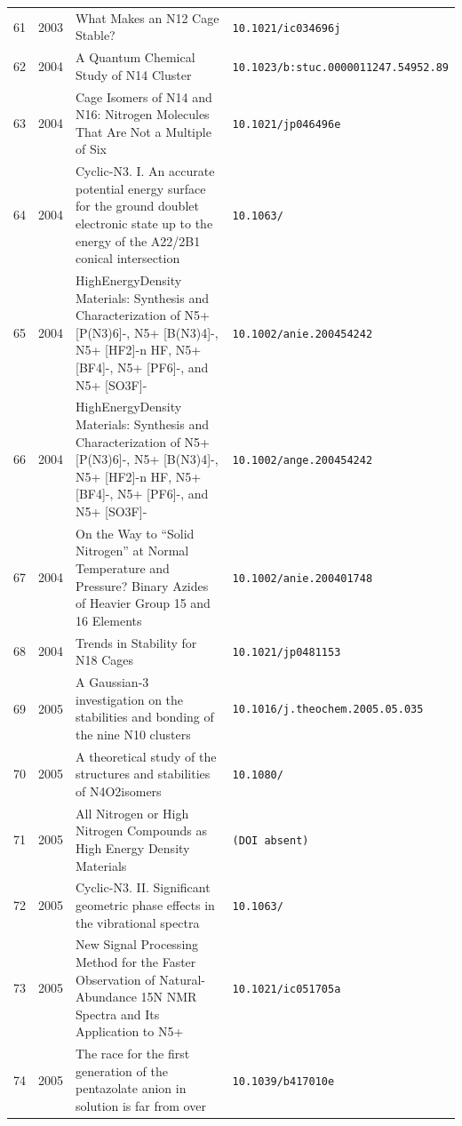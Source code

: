 {\begin{longtable}{@{}cp{1.0cm}p{8.4cm}p{4.2cm}@{}}
61 & 2003 & What Makes an N12 Cage Stable? & \texttt{10.1021/\allowbreak ic034696j} \\
62 & 2004 & A Quantum Chemical Study of N14 Cluster & \texttt{10.1023/\allowbreak b:stuc.0000011247.54952.89} \\
63 & 2004 & Cage Isomers of N14 and N16: Nitrogen Molecules That Are Not a Multiple of Six & \texttt{10.1021/\allowbreak jp046496e} \\
64 & 2004 & Cyclic-N3. I. An accurate potential energy surface for the ground doublet electronic state up to the energy of the A22/2B1 conical intersection & \texttt{10.1063/\allowbreak 1.1780158} \\
65 & 2004 & HighEnergyDensity Materials: Synthesis and Characterization of N5+[P(N3)6]-, N5+ [B(N3)4]-, N5+ [HF2]-n HF, N5+ [BF4]-, N5+ [PF6]-, and N5+ [SO3F]- & \texttt{10.1002/\allowbreak anie.200454242} \\
66 & 2004 & HighEnergyDensity Materials: Synthesis and Characterization of N5+[P(N3)6]-, N5+ [B(N3)4]-, N5+ [HF2]-n HF, N5+ [BF4]-, N5+ [PF6]-, and N5+ [SO3F]- & \texttt{10.1002/\allowbreak ange.200454242} \\
67 & 2004 & On the Way to ``Solid Nitrogen'' at Normal Temperature and Pressure? Binary Azides of Heavier Group 15 and 16 Elements & \texttt{10.1002/\allowbreak anie.200401748} \\
68 & 2004 & Trends in Stability for N18 Cages & \texttt{10.1021/\allowbreak jp0481153} \\
69 & 2005 & A Gaussian-3 investigation on the stabilities and bonding of the nine N10 clusters & \texttt{10.1016/\allowbreak j.theochem.2005.05.035} \\
70 & 2005 & A theoretical study of the structures and stabilities of N4O2isomers & \texttt{10.1080/\allowbreak 00268970512331317345} \\
71 & 2005 & All Nitrogen or High Nitrogen Compounds as High Energy Density Materials & \texttt{(DOI absent)} \\
72 & 2005 & Cyclic-N3. II. Significant geometric phase effects in the vibrational spectra & \texttt{10.1063/\allowbreak 1.1824905} \\
73 & 2005 & New Signal Processing Method for the Faster Observation of Natural-Abundance 15N NMR Spectra and Its Application to N5+ & \texttt{10.1021/\allowbreak ic051705a} \\
74 & 2005 & The race for the first generation of the pentazolate anion in solution is far from over & \texttt{10.1039/\allowbreak b417010e} \\

\end{longtable}}
